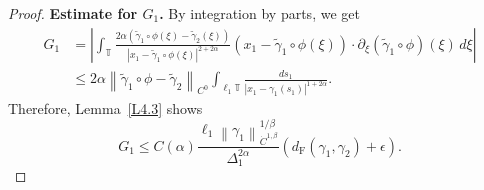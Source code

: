 \documentclass[reqno,centertags,12pt]{amsart}
\theoremstyle{definition}
\numberwithin{equation}{section}
\newcommand{\abs}[1]{\left\lvert#1\right\rvert}
\newcommand{\norm}[1]{\left\|#1\right\|}
\newcommand{\bbT}{{\mathbb{T}}}
\begin{document}
\begin{proof}
    \textbf{Estimate for $G_{1}$.} By integration by parts, we get
    \begin{align*}
        G_{1} &= \abs{
            \int_{\bbT}
            \frac{2\alpha(\tilde{\gamma}_{1}\circ\phi(\xi) - \tilde{\gamma}_{2}(\xi))}
            {\abs{x_{1} - \tilde{\gamma}_{1}\circ\phi(\xi)}^{2+2\alpha}}
            (x_{1} - \tilde{\gamma}_{1}\circ\phi(\xi))\cdot
            \partial_{\xi}(\tilde{\gamma}_{1}\circ\phi)(\xi)\,d\xi
        } \\
        &\leq 2\alpha\norm{\tilde{\gamma}_{1}\circ\phi - \tilde{\gamma}_{2}}_{C^{0}}
        \int_{\ell_{1}\bbT}\frac{ds_{1}}{\abs{x_{1} - \gamma_{1}(s_{1})}^{1+2\alpha}}.
    \end{align*}
    Therefore, Lemma~\ref{L4.3} shows
    \[
        G_{1} \leq C(\alpha)
        \frac{\ell_{1}\norm{\gamma_{1}}_{\dot{C}^{1,\beta}}^{1/\beta}}
        {\Delta_{1}^{2\alpha}}
        \left(d_{\mathrm{F}}(\gamma_{1},\gamma_{2}) + \epsilon\right).
    \]


\end{proof}
\end{document}
